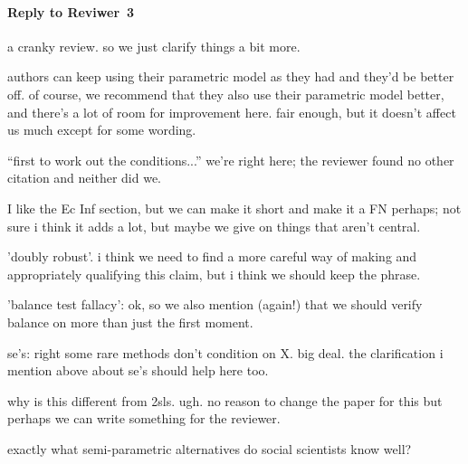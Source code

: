 \documentclass[11pt]{article}
\begin{document}
\paragraph{Reply to Reviwer~3}

a cranky review.  so we just clarify things a bit more.

authors can keep using their parametric model as they had and they'd
be better off.  of course, we recommend that they also use their
parametric model better, and there's a lot of room for improvement
here.  fair enough, but it doesn't affect us much except for some
wording.

``first to work out the conditions...''  we're right here; the
reviewer found no other citation and neither did we.

I like the Ec Inf section, but we can make it short and make it a FN
perhaps; not sure i think it adds a lot, but maybe we give on things
that aren't central.

'doubly robust'.  i think we need to find a more careful way of making
and appropriately qualifying this claim, but i think we should keep
the phrase.
 
'balance test fallacy':  ok, so we also mention (again!) that we
should verify balance on more than just the first moment.

se's:  right some rare methods don't condition on X.  big deal.  the
clarification i mention above about se's should help here too.

why is this different from 2sls.  ugh.  no reason to change the paper
for this but perhaps we can write something for the reviewer.

exactly what semi-parametric alternatives do social scientists know
well?  
\end{document}
